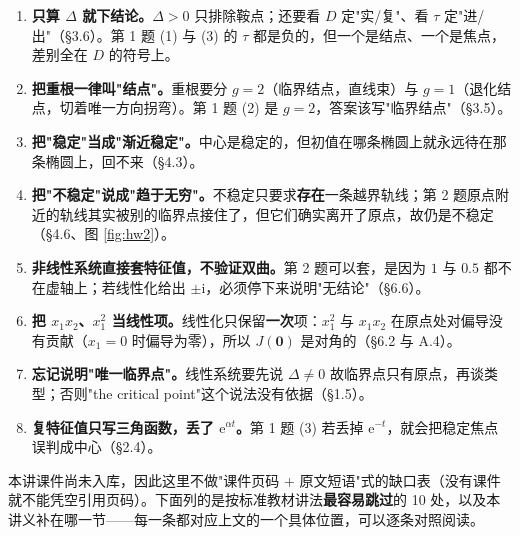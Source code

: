 \documentclass[11pt]{ctexart}
\newcommand{\Jac}{J}
\begin{document}
\begin{enumerate}
\item \textbf{只算 $\Delta$ 就下结论。}$\Delta>0$ 只排除鞍点；还要看 $D$ 定"实/复"、看 $\tau$ 定"进/出"（§3.6）。第 1 题 (1) 与 (3) 的 $\tau$ 都是负的，但一个是结点、一个是焦点，差别全在 $D$ 的符号上。
\item \textbf{把重根一律叫"结点"。}重根要分 $g=2$（临界结点，直线束）与 $g=1$（退化结点，切着唯一方向拐弯）。第 1 题 (2) 是 $g=2$，答案该写"临界结点"（§3.5）。
\item \textbf{把"稳定"当成"渐近稳定"。}中心是稳定的，但初值在哪条椭圆上就永远待在那条椭圆上，回不来（§4.3）。
\item \textbf{把"不稳定"说成"趋于无穷"。}不稳定只要求\textbf{存在}一条越界轨线；第 2 题原点附近的轨线其实被别的临界点接住了，但它们确实离开了原点，故仍是不稳定（§4.6、图 \ref{fig:hw2}）。
\item \textbf{非线性系统直接套特征值，不验证双曲。}第 2 题可以套，是因为 $1$ 与 $0.5$ 都不在虚轴上；若线性化给出 $\pm\mathrm{i}$，必须停下来说明"无结论"（§6.6）。
\item \textbf{把 $x_1x_2$、$x_1^{2}$ 当线性项。}线性化只保留\textbf{一次}项：$x_1^{2}$ 与 $x_1x_2$ 在原点处对偏导没有贡献（$x_1=0$ 时偏导为零），所以 $\Jac(\mathbf{0})$ 是对角的（§6.2 与 A.4）。
\item \textbf{忘记说明"唯一临界点"。}线性系统要先说 $\Delta\neq0$ 故临界点只有原点，再谈类型；否则"the critical point"这个说法没有依据（§1.5）。
\item \textbf{复特征值只写三角函数，丢了 $\mathrm{e}^{\alpha t}$。}第 1 题 (3) 若丢掉 $\mathrm{e}^{-t}$，就会把稳定焦点误判成中心（§2.4）。
\end{enumerate}


本讲课件尚未入库，因此这里不做"课件页码 + 原文短语"式的缺口表（没有课件就不能凭空引用页码）。下面列的是按标准教材讲法\textbf{最容易跳过}的 10 处，以及本讲义补在哪一节——每一条都对应上文的一个具体位置，可以逐条对照阅读。
\end{document}
